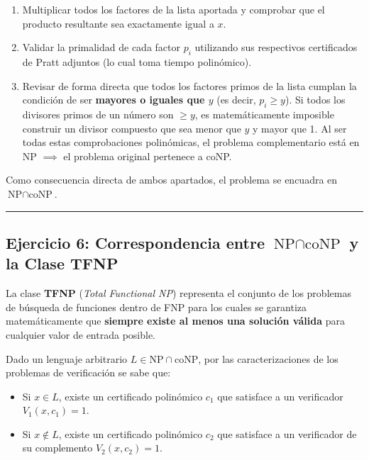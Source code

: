 \documentclass[12pt]{book} %
\begin{document}
\begin{enumerate}
\def\labelenumi{\arabic{enumi}.}
\item
  Multiplicar todos los factores de la lista aportada y comprobar que el
  producto resultante sea exactamente igual a \(x\).
\item
  Validar la primalidad de cada factor \(p_i\) utilizando sus
  respectivos certificados de Pratt adjuntos (lo cual toma tiempo
  polinómico).
\item
  Revisar de forma directa que todos los factores primos de la lista
  cumplan la condición de ser \textbf{mayores o iguales que \(y\)} (es
  decir, \(p_i \ge y\)). Si todos los divisores primos de un número son
  \(\ge y\), es matemáticamente imposible construir un divisor compuesto
  que sea menor que \(y\) y mayor que 1. Al ser todas estas
  comprobaciones polinómicas, el problema complementario está en NP
  \(\implies\) el problema original pertenece a coNP.
\end{enumerate}

Como consecuencia directa de ambos apartados, el problema se encuadra en
\(\text{NP} \cap \text{coNP}\).

\begin{center}\rule{0.5\linewidth}{0.5pt}\end{center}

\hypertarget{ejercicio-6-correspondencia-entre-textnp-cap-textconp-y-la-clase-tfnp}{%
\subsection{\texorpdfstring{Ejercicio 6: Correspondencia entre
\(\text{NP} \cap \text{coNP}\) y la Clase
TFNP}{Ejercicio 6: Correspondencia entre \textbackslash text\{NP\} \textbackslash cap \textbackslash text\{coNP\} y la Clase TFNP}}\label{ejercicio-6-correspondencia-entre-textnp-cap-textconp-y-la-clase-tfnp}}

La clase \textbf{TFNP} (\emph{Total Functional NP}) representa el
conjunto de los problemas de búsqueda de funciones dentro de FNP para
los cuales se garantiza matemáticamente que \textbf{siempre existe al
menos una solución válida} para cualquier valor de entrada posible.

Dado un lenguaje arbitrario \(L \in \text{NP} \cap \text{coNP}\), por
las caracterizaciones de los problemas de verificación se sabe que:

\begin{itemize}
\item
  Si \(x \in L\), existe un certificado polinómico \(c_1\) que satisface
  a un verificador \(V_1(x, c_1) = 1\).
\item
  Si \(x \notin L\), existe un certificado polinómico \(c_2\) que
  satisface a un verificador de su complemento \(V_2(x, c_2) = 1\).
\end{itemize}
\end{document}
